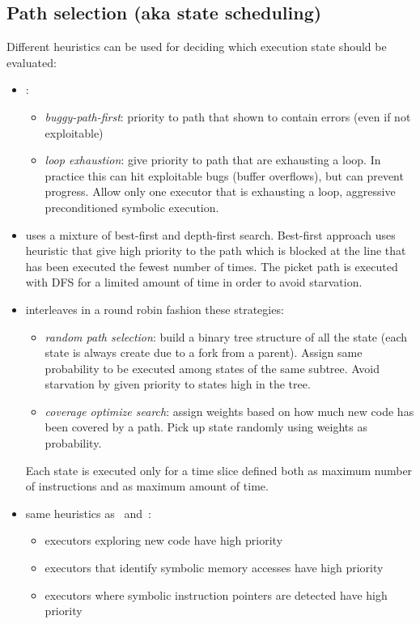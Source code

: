 \documentclass[10pt, a4paper]{article}
\begin{document}
\subsection{Path selection (aka state scheduling)}
Different heuristics can be used for deciding which execution state should be evaluated:
\begin{itemize}

  \item \cite{AEG-NDSS11}:
  \begin{itemize}
    \item {\em buggy-path-first}: priority to path that shown to contain errors (even if not exploitable)
    \item {\em loop exhaustion}: give priority to path that are exhausting a loop. In practice this can hit exploitable bugs (buffer overflows), but can prevent progress. Allow only one executor that is exhausting a loop, aggressive preconditioned symbolic execution.
  \end{itemize}

  \item \cite{EXE-CCS06} uses a mixture of best-first and depth-first search. Best-first approach uses heuristic that give high priority to the path which is blocked at the line that has been executed the fewest number of times. The picket path is executed with DFS for a limited amount of time in order to avoid starvation. 

  \item \cite{KLEE-OSDI08} interleaves in a round robin fashion these strategies:
  \begin{itemize}
    \item {\em random path selection}: build a binary tree structure of all the state (each state is always create due to a fork from a parent). Assign same probability to be executed among states of the same subtree. Avoid starvation by given priority to states high in the tree.
    \item {\em coverage optimize search}: assign weights based on how much new code has been covered by a path. Pick up state randomly using weights as probability.
  \end{itemize}
  Each state is executed only for a time slice defined both as maximum number of instructions and as maximum amount of time.

  \item \cite{MAYHEM-SP12} same heuristics as~\cite{SAGE-NDSS08} and~\cite{KLEE-OSDI08}:
  \begin{itemize}
    \item executors exploring new code have high priority
    \item executors that identify symbolic memory accesses have high priority
    \item executors where symbolic instruction pointers are detected have high priority
  \end{itemize}
\end{itemize}
\end{document}
